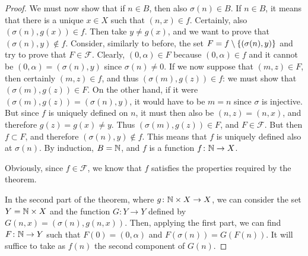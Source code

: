 \begin{proof}
We must now show that if $n\in B$, then also $\sigma(n)\in B$.
If $n\in B$, it means that there is a unique $x\in X$ such that $(n,x)\in f$.
Certainly, also $(\sigma(n),g(x))\in f$.
Then take $y\neq g(x)$, and we want to prove that $(\sigma(n),y)\not \in f$.
Consider, similarly to before, the set $F=f\setminus{\left\{ (\sigma(n),y) \right\}}$
and try to prove that $F\in \mathcal F$.
Clearly, $(0,\alpha)\in F$ because $(0,\alpha)\in f$ 
and it cannot be $(0,\alpha)=(\sigma(n),y)$ since $\sigma(n)\neq 0$.
If we now suppose that $(m,z)\in F$, then certainly $(m,z)\in f$, 
and thus $(\sigma(m),g(z))\in f$: 
we must show that $(\sigma(m),g(z))\in F$. 
On the other hand, if it were $(\sigma(m), g(z))=(\sigma(n),y)$, 
it would have to be $m=n$ since $\sigma$ is injective. 
But since $f$ is uniquely defined on $n$, it must then also be 
$(n,z) = (n,x)$, and therefore $g(z)=g(x) \neq y$. 
Thus $(\sigma(m),g(z))\in F$, and $F\in \mathcal F$.
But then $f\subset F$, and therefore $(\sigma(n),y)\not \in f$.
This means that $f$ is uniquely defined also at $\sigma(n)$.
By induction, $B={\mathbb N}$, and $f$ is a function $f\colon {\mathbb N}\to X$.

Obviously, since $f\in \mathcal F$, we know that $f$ 
satisfies the properties required by the theorem.

In the second part of the theorem, where $g\colon {\mathbb N}\times X \to X$,
we can consider the set $Y={\mathbb N}\times X$ and the function 
$G\colon Y\to Y$ defined by $G(n,x) = (\sigma(n), g(n,x))$.
Then, applying the first part, we can find $F\colon {\mathbb N}\to Y$
such that $F(0) = (0,\alpha)$ and $F(\sigma(n)) = G(F(n))$.
It will suffice to take as $f(n)$ the second component of $G(n)$.
\end{proof}

